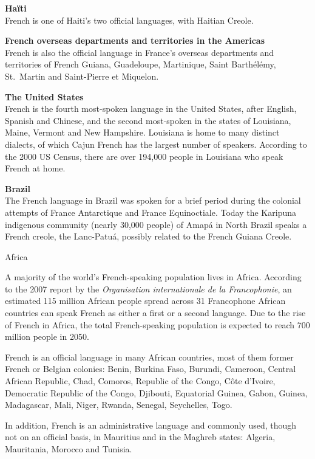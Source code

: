 \begin{multicols}{2}
{\bf Haïti}\\
French is one of Haiti's two official languages, with Haitian Creole. 

{\bf French overseas departments and territories in the Americas}\\
French is also the official language in France's overseas departments and territories of French Guiana, Guadeloupe, Martinique, Saint Barthélémy, St.~Martin and Saint-Pierre et Miquelon.

{\bf The United States }\\
French is the fourth most-spoken language in the United States, after
English, Spanish and Chinese, and the second most-spoken in the states
of Louisiana, Maine, Vermont and New Hampshire. Louisiana is home to
many distinct dialects, of which Cajun French has the largest number
of speakers. According to the 2000 US Census, there are over 194,000
people in Louisiana who speak French at home.

{\bf Brazil}\\
The French language in Brazil was spoken for a brief period during the
colonial attempts of France Antarctique and France Equinoctiale. Today
the Karipuna indigenous community (nearly 30,000 people) of Amapá in
North Brazil speaks a French creole, the Lanc-Patuá, possibly related
to the French Guiana Creole.

\begin{center}
{\sc Africa}
\end{center}

A majority of the world's French-speaking population lives in
Africa. According to the 2007 report by the {\em Organisation
internationale de la Francophonie}, an estimated 115 million African
people spread across 31 Francophone African countries can speak French
as either a first or a second language. Due to the rise of French in
Africa, the total French-speaking population is expected to reach 700
million people in 2050.

French is an official language in many African countries, most of them
former French or Belgian colonies: Benin, Burkina Faso, Burundi,
Cameroon, Central African Republic, Chad, Comoros, Republic of the
Congo, Côte d'Ivoire, Democratic Republic of the Congo, Djibouti,
Equatorial Guinea, Gabon, Guinea, Madagascar, Mali, Niger, Rwanda,
Senegal, Seychelles, Togo.

In addition, French is an administrative language and commonly used,
though not on an official basis, in Mauritius and in the Maghreb
states: Algeria, Mauritania, Morocco and Tunisia.


\end{multicols}
